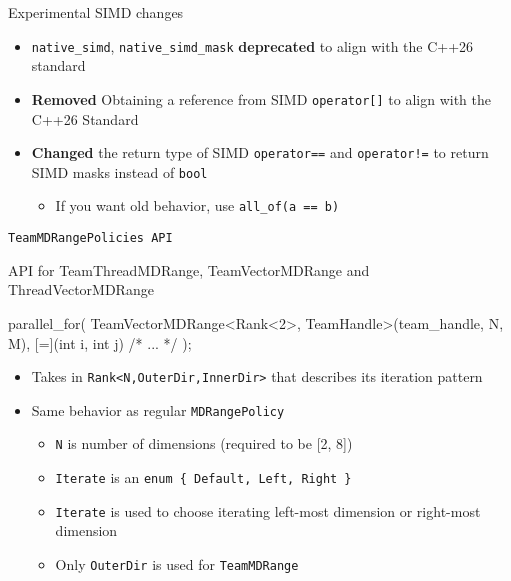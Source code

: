 \begin{frame}[fragile]{Experimental SIMD changes}
  \begin{itemize}
    \item \texttt{native\_simd}, \texttt{native\_simd\_mask} \textbf{deprecated} to align with the C++26 standard
    \item \textbf{Removed} Obtaining a reference from SIMD \texttt{operator[]} to align with the C++26 Standard
    \item \textbf{Changed} the return type of SIMD \texttt{operator==} and \texttt{operator!=} to return SIMD masks instead of \texttt{bool}
    \begin{itemize}
      \item If you want old behavior, use \texttt{all\_of(a == b)}
    \end{itemize}
  \end{itemize}
\end{frame}

\begin{frame}[fragile]{\texttt{TeamMDRangePolicies API}}

API for TeamThreadMDRange, TeamVectorMDRange and ThreadVectorMDRange

\vspace{10pt}

\begin{code}[keywords={TeamVectorMDRange}]
 parallel_for(
   TeamVectorMDRange<Rank<2>, TeamHandle>(team_handle, N, M),
   [=](int i, int j) { /* ... */ }
 );
\end{code}

\vspace{10pt}

\begin{itemize}
  \item Takes in \texttt{Rank<N,OuterDir,InnerDir>} that describes its iteration pattern
  \item Same behavior as regular \texttt{MDRangePolicy}
  \begin{itemize}
    \item \texttt{N} is number of dimensions (required to be [2, 8])
    \item \texttt{Iterate} is an \texttt{enum \{ Default, Left, Right \}}
    \item \texttt{Iterate} is used to choose iterating left-most dimension or right-most dimension
    \item Only \texttt{OuterDir} is used for \texttt{TeamMDRange}
  \end{itemize}
\end{itemize}
\end{frame}

